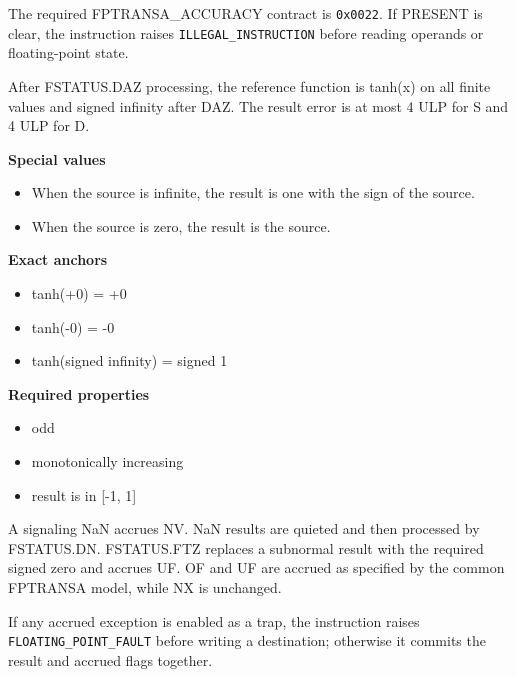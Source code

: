 The required FPTRANSA\_ACCURACY contract is \texttt{0x0022}. If PRESENT is clear, the instruction raises \texttt{ILLEGAL\_INSTRUCTION} before reading operands or floating-point state.

After FSTATUS.DAZ processing, the reference function is tanh(x) on all finite values and signed infinity after DAZ. The result error is at most 4 ULP for S and 4 ULP for D.

\textbf{Special values}\par
\begin{itemize}
\item When the source is infinite, the result is one with the sign of the source.
\item When the source is zero, the result is the source.
\end{itemize}

\textbf{Exact anchors}\par
\begin{itemize}
\item tanh(+0) = +0
\item tanh(-0) = -0
\item tanh(signed infinity) = signed 1
\end{itemize}

\textbf{Required properties}\par
\begin{itemize}
\item odd
\item monotonically increasing
\item result is in [-1, 1]
\end{itemize}

A signaling NaN accrues NV. NaN results are quieted and then processed by FSTATUS.DN. FSTATUS.FTZ replaces a subnormal result with the required signed zero and accrues UF. OF and UF are accrued as specified by the common FPTRANSA model, while NX is unchanged.

If any accrued exception is enabled as a trap, the instruction raises \texttt{FLOATING\_POINT\_FAULT} before writing a destination; otherwise it commits the result and accrued flags together.
